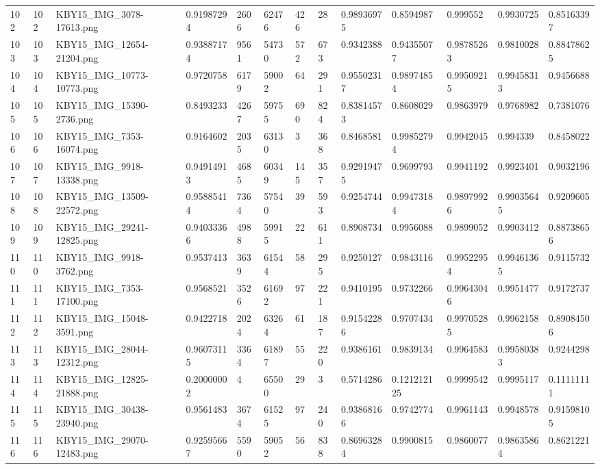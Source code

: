 \documentclass[11pt, a4paper, twoside]{report}
\begin{document}
\begin{longtable}[c]{@{}lllllllllllll@{}}
102 & 102 & KBY15\_IMG\_3078-17613.png & 0.91987294 & 2606 & 62476 & 426 & 28 & 0.98936975 & 0.8594987 & 0.999552 & 0.9930725 & 0.85163397 \\
103 & 103 & KBY15\_IMG\_12654-21204.png & 0.93887174 & 9561 & 54730 & 572 & 673 & 0.9342388 & 0.94355077 & 0.98785263 & 0.9810028 & 0.88478625 \\
104 & 104 & KBY15\_IMG\_10773-10773.png & 0.9720758 & 6179 & 59002 & 64 & 291 & 0.95502317 & 0.98974854 & 0.99509215 & 0.99458313 & 0.9456688 \\
105 & 105 & KBY15\_IMG\_15390-2736.png & 0.8493233 & 4267 & 59755 & 690 & 824 & 0.83814573 & 0.8608029 & 0.9863979 & 0.9768982 & 0.7381076 \\
106 & 106 & KBY15\_IMG\_7353-16074.png & 0.9164602 & 2035 & 63130 & 3 & 368 & 0.8468581 & 0.99852794 & 0.9942045 & 0.994339 & 0.8458022 \\
107 & 107 & KBY15\_IMG\_9918-13338.png & 0.94914913 & 4685 & 60349 & 145 & 357 & 0.92919475 & 0.9699793 & 0.9941192 & 0.9923401 & 0.9032196 \\
108 & 108 & KBY15\_IMG\_13509-22572.png & 0.95885414 & 7364 & 57540 & 39 & 593 & 0.9254744 & 0.99473184 & 0.98979926 & 0.99035645 & 0.9209605 \\
109 & 109 & KBY15\_IMG\_29241-12825.png & 0.94033366 & 4988 & 59915 & 22 & 611 & 0.8908734 & 0.9956088 & 0.9899052 & 0.9903412 & 0.88738656 \\
110 & 110 & KBY15\_IMG\_9918-3762.png & 0.9537413 & 3639 & 61544 & 58 & 295 & 0.9250127 & 0.9843116 & 0.99522954 & 0.99461365 & 0.9115732 \\
111 & 111 & KBY15\_IMG\_7353-17100.png & 0.9568521 & 3526 & 61692 & 97 & 221 & 0.9410195 & 0.9732266 & 0.99643046 & 0.9951477 & 0.9172737 \\
112 & 112 & KBY15\_IMG\_15048-3591.png & 0.9422718 & 2024 & 63264 & 61 & 187 & 0.91542286 & 0.9707434 & 0.99705285 & 0.9962158 & 0.89084506 \\
113 & 113 & KBY15\_IMG\_28044-12312.png & 0.96073115 & 3364 & 61897 & 55 & 220 & 0.9386161 & 0.9839134 & 0.9964583 & 0.99580383 & 0.9244298 \\
114 & 114 & KBY15\_IMG\_12825-21888.png & 0.20000002 & 4 & 65500 & 29 & 3 & 0.5714286 & 0.121212125 & 0.9999542 & 0.9995117 & 0.11111111 \\
115 & 115 & KBY15\_IMG\_30438-23940.png & 0.9561483 & 3674 & 61525 & 97 & 240 & 0.93868166 & 0.9742774 & 0.9961143 & 0.9948578 & 0.91598105 \\
116 & 116 & KBY15\_IMG\_29070-12483.png & 0.92595667 & 5590 & 59052 & 56 & 838 & 0.86963284 & 0.9900815 & 0.9860077 & 0.98635864 & 0.8621221 \\

\end{longtable}
\end{document}
